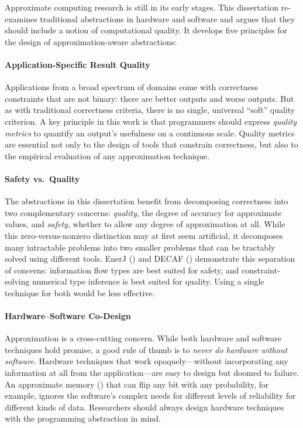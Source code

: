 Approximate computing research is still in its early stages.
This dissertation re-examines traditional abstractions in hardware and
software and argues that they should include a notion of computational
quality.
It develops five principles for the design of approximation-aware
abstractions:

\paragraph{Application-Specific Result Quality}
Applications from a broad spectrum of domains come with correctness constraints that are
not binary:
there are better outputs and worse outputs.
But as with traditional correctness criteria, there is no single, universal
``soft'' quality criterion.
A key principle in this work is that programmers should express
\emph{quality metrics} to quantify an output's usefulness on a continuous
scale.
Quality metrics are essential not only to the design of tools that constrain
correctness,
but also to the empirical evaluation of any approximation technique.

\paragraph{Safety vs.~Quality}
The abstractions in this dissertation benefit from decomposing correctness
into two complementary concerns:
\emph{quality}, the degree of accuracy for approximate values, and
\emph{safety}, whether to allow any degree of approximation at all.
While this zero-versus-nonzero distinction may at first seem artificial, it
decomposes many intractable problems into two smaller problems that can be
tractably solved using different tools.
EnerJ () and DECAF () demonstrate this separation of
concerns:
information flow types are best suited for safety,
and constraint-solving numerical type inference is best suited for quality.
Using a single technique for both would be less effective.

\paragraph{Hardware--Software Co-Design}
Approximation is a cross-cutting concern.
While both hardware and software techniques hold promise, a good rule of thumb
is to \emph{never do hardware without software}.
Hardware techniques that work opaquely---without incorporating any information
at all from the application---are easy to design but doomed to failure.
An approximate memory () that can flip any bit with any
probability, for example,
ignores the software's complex needs for different levels of reliability for
different kinds of data.
Researchers should always design hardware techniques with the programming
abstraction in mind.

